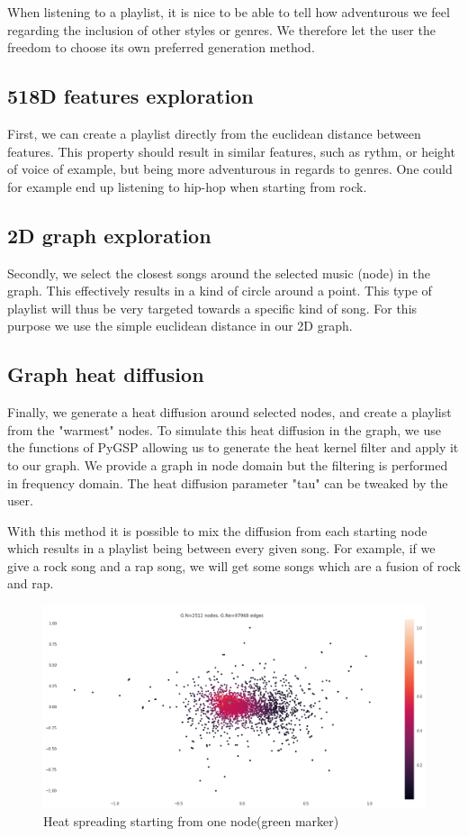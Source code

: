 \documentclass[11pt,a4paper,twoside]{article}
\begin{document}
When listening to a playlist, it is nice to be able to tell how adventurous we feel regarding the inclusion of other styles or genres. We therefore let the user the freedom to choose its own preferred generation method. 

\subsection{518D features exploration}
First, we can create a playlist directly from the euclidean distance between features. This property should result in similar features, such as rythm, or height of voice of example, but being more adventurous in regards to genres. One could for example end up listening to hip-hop when starting from rock.

\subsection{2D graph exploration}
Secondly, we select the closest songs around the selected music (node) in the graph. This effectively results in a kind of circle around a point. This type of playlist will thus be very targeted towards a specific kind of song. For this purpose we use the simple euclidean distance in our 2D graph.

\subsection{Graph heat diffusion}
Finally, we generate a heat diffusion around selected nodes, and create a playlist from the "warmest" nodes. To simulate this heat diffusion in the graph, we use the functions of PyGSP allowing us to generate the heat kernel filter and apply it to our graph. We provide a graph in node domain but the filtering is performed in frequency domain. The heat diffusion parameter "tau" can be tweaked by the user.

With this method it is possible to mix the diffusion from each starting node which results in a playlist being between every given song. For example, if we give a rock song and a rap song, we will get some songs which are a fusion of rock and rap.

\newpage

\begin{figure}[H]
  \centering
    \includegraphics[width=\textwidth]{./Figures/heat}
  \caption{Heat spreading starting from one node(green marker)}
  \label{fig:}
\end{figure}
\end{document}

